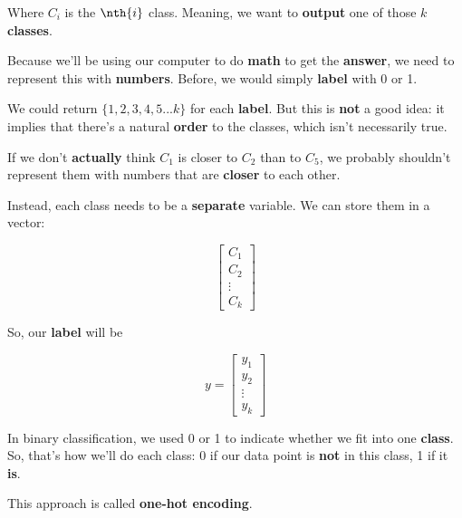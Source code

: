         Where $C_i$ is the $\nth{i}$ class. Meaning, we want to \textbf{output} one of those $k$ \textbf{classes}.
        
        Because we'll be using our computer to do \textbf{math} to get the \textbf{answer}, we need to represent this with \textbf{numbers}. Before, we would simply \textbf{label} with 0 or 1. 
        
        We could return $\{1,2,3,4,5...k\}$ for each \textbf{label}. But this is \textbf{not} a good idea: it implies that there's a natural \textbf{order} to the classes, which isn't necessarily true.
        
        If we don't \textbf{actually} think $C_1$ is closer to $C_2$ than to $C_5$, we probably shouldn't represent them with numbers that are \textbf{closer} to each other.
        
        Instead, each class needs to be a \textbf{separate} variable. We can store them in a vector:
        
        \begin{equation}
            \begin{bmatrix}
              C_1\\C_2\\ \vdots \\ C_k
            \end{bmatrix}
        \end{equation}
        
        So, our \textbf{label} will be
        
        \begin{equation}
            y=
            \begin{bmatrix}
              y_1\\y_2\\ \vdots \\ y_k
            \end{bmatrix}
        \end{equation}
        
        In binary classification, we used 0 or 1 to indicate whether we fit into one \textbf{class}. So, that's how we'll do each class: 0 if our data point is \textbf{not} in this class, 1 if it \textbf{is}.
        
        This approach is called \textbf{one-hot encoding}.\\
        
